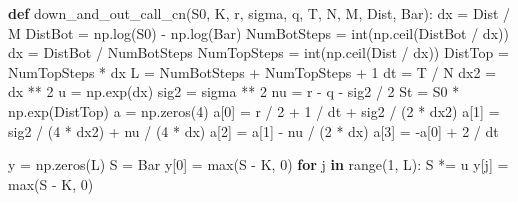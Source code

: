 \documentclass[
  letterpaper,
  DIV=11,
  numbers=noendperiod]{scrartcl}
\newenvironment{Shaded}{\begin{snugshade}}{\end{snugshade}}
\newcommand{\BuiltInTok}[1]{\textcolor[rgb]{0.00,0.23,0.31}{#1}}
\newcommand{\ControlFlowTok}[1]{\textcolor[rgb]{0.00,0.23,0.31}{\textbf{#1}}}
\newcommand{\DecValTok}[1]{\textcolor[rgb]{0.68,0.00,0.00}{#1}}
\newcommand{\KeywordTok}[1]{\textcolor[rgb]{0.00,0.23,0.31}{\textbf{#1}}}
\newcommand{\NormalTok}[1]{\textcolor[rgb]{0.00,0.23,0.31}{#1}}
\newcommand{\OperatorTok}[1]{\textcolor[rgb]{0.37,0.37,0.37}{#1}}
\theoremstyle{definition}
\theoremstyle{remark}
\begin{document}
\label{my_code_block}
\begin{Shaded}
\begin{Highlighting}[]
\KeywordTok{def}\NormalTok{ down\_and\_out\_call\_cn(S0, K, r, sigma, q, T, N, M, Dist, Bar):}
\NormalTok{    dx }\OperatorTok{=}\NormalTok{ Dist }\OperatorTok{/}\NormalTok{ M}
\NormalTok{    DistBot }\OperatorTok{=}\NormalTok{ np.log(S0) }\OperatorTok{{-}}\NormalTok{ np.log(Bar)}
\NormalTok{    NumBotSteps }\OperatorTok{=} \BuiltInTok{int}\NormalTok{(np.ceil(DistBot }\OperatorTok{/}\NormalTok{ dx))}
\NormalTok{    dx }\OperatorTok{=}\NormalTok{ DistBot }\OperatorTok{/}\NormalTok{ NumBotSteps}
\NormalTok{    NumTopSteps }\OperatorTok{=} \BuiltInTok{int}\NormalTok{(np.ceil(Dist }\OperatorTok{/}\NormalTok{ dx))}
\NormalTok{    DistTop }\OperatorTok{=}\NormalTok{ NumTopSteps }\OperatorTok{*}\NormalTok{ dx}
\NormalTok{    L }\OperatorTok{=}\NormalTok{ NumBotSteps }\OperatorTok{+}\NormalTok{ NumTopSteps }\OperatorTok{+} \DecValTok{1}
\NormalTok{    dt }\OperatorTok{=}\NormalTok{ T }\OperatorTok{/}\NormalTok{ N}
\NormalTok{    dx2 }\OperatorTok{=}\NormalTok{ dx }\OperatorTok{**} \DecValTok{2}
\NormalTok{    u }\OperatorTok{=}\NormalTok{ np.exp(dx)}
\NormalTok{    sig2 }\OperatorTok{=}\NormalTok{ sigma }\OperatorTok{**} \DecValTok{2}
\NormalTok{    nu }\OperatorTok{=}\NormalTok{ r }\OperatorTok{{-}}\NormalTok{ q }\OperatorTok{{-}}\NormalTok{ sig2 }\OperatorTok{/} \DecValTok{2}
\NormalTok{    St }\OperatorTok{=}\NormalTok{ S0 }\OperatorTok{*}\NormalTok{ np.exp(DistTop)}
\NormalTok{    a }\OperatorTok{=}\NormalTok{ np.zeros(}\DecValTok{4}\NormalTok{)}
\NormalTok{    a[}\DecValTok{0}\NormalTok{] }\OperatorTok{=}\NormalTok{ r }\OperatorTok{/} \DecValTok{2} \OperatorTok{+} \DecValTok{1} \OperatorTok{/}\NormalTok{ dt }\OperatorTok{+}\NormalTok{ sig2 }\OperatorTok{/}\NormalTok{ (}\DecValTok{2} \OperatorTok{*}\NormalTok{ dx2)}
\NormalTok{    a[}\DecValTok{1}\NormalTok{] }\OperatorTok{=}\NormalTok{ sig2 }\OperatorTok{/}\NormalTok{ (}\DecValTok{4} \OperatorTok{*}\NormalTok{ dx2) }\OperatorTok{+}\NormalTok{ nu }\OperatorTok{/}\NormalTok{ (}\DecValTok{4} \OperatorTok{*}\NormalTok{ dx)}
\NormalTok{    a[}\DecValTok{2}\NormalTok{] }\OperatorTok{=}\NormalTok{ a[}\DecValTok{1}\NormalTok{] }\OperatorTok{{-}}\NormalTok{ nu }\OperatorTok{/}\NormalTok{ (}\DecValTok{2} \OperatorTok{*}\NormalTok{ dx)}
\NormalTok{    a[}\DecValTok{3}\NormalTok{] }\OperatorTok{=} \OperatorTok{{-}}\NormalTok{a[}\DecValTok{0}\NormalTok{] }\OperatorTok{+} \DecValTok{2} \OperatorTok{/}\NormalTok{ dt}

\NormalTok{    y }\OperatorTok{=}\NormalTok{ np.zeros(L)}
\NormalTok{    S }\OperatorTok{=}\NormalTok{ Bar}
\NormalTok{    y[}\DecValTok{0}\NormalTok{] }\OperatorTok{=} \BuiltInTok{max}\NormalTok{(S }\OperatorTok{{-}}\NormalTok{ K, }\DecValTok{0}\NormalTok{)}
    \ControlFlowTok{for}\NormalTok{ j }\KeywordTok{in} \BuiltInTok{range}\NormalTok{(}\DecValTok{1}\NormalTok{, L):}
\NormalTok{        S }\OperatorTok{*=}\NormalTok{ u}
\NormalTok{        y[j] }\OperatorTok{=} \BuiltInTok{max}\NormalTok{(S }\OperatorTok{{-}}\NormalTok{ K, }\DecValTok{0}\NormalTok{)}


\end{Highlighting}
\end{Shaded}
\end{document}
